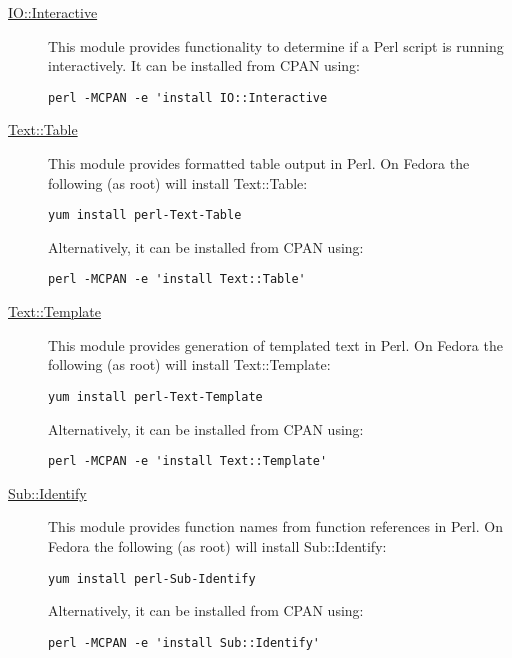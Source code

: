\begin{description}
  \item [\href{http://search.cpan.org/~bdfoy/IO-Interactive-0.0.6/lib/IO/Interactive.pm}{{\normalfont \ttfamily IO::Interactive}}] This module provides functionality to determine if a Perl script is running interactively. It can be installed from CPAN using:
\begin{verbatim}
perl -MCPAN -e 'install IO::Interactive
\end{verbatim}

  \item [\href{http://search.cpan.org/~anno/Text-Table-1.114/lib/Text/Table.pm}{{\normalfont \ttfamily Text::Table}}] This module provides formatted table output in Perl. On Fedora the following (as root) will install {\normalfont \ttfamily Text::Table}:
\begin{verbatim}
yum install perl-Text-Table
\end{verbatim}
Alternatively, it can be installed from CPAN using:
\begin{verbatim}
perl -MCPAN -e 'install Text::Table'
\end{verbatim}

  \item [\href{http://search.cpan.org/~mjd/Text-Template-1.46/lib/Text/Template.pm}{{\normalfont \ttfamily Text::Template}}] This module provides generation of templated text in Perl. On Fedora the following (as root) will install {\normalfont \ttfamily Text::Template}:
\begin{verbatim}
yum install perl-Text-Template
\end{verbatim}
Alternatively, it can be installed from CPAN using:
\begin{verbatim}
perl -MCPAN -e 'install Text::Template'
\end{verbatim}

  \item [\href{http://search.cpan.org/~rgarcia/Sub-Identify-0.12/lib/Sub/Identify.pm}{{\normalfont \ttfamily Sub::Identify}}] This module provides function names from function references in Perl. On Fedora the following (as root) will install {\normalfont \ttfamily Sub::Identify}:
\begin{verbatim}
yum install perl-Sub-Identify
\end{verbatim}
Alternatively, it can be installed from CPAN using:
\begin{verbatim}
perl -MCPAN -e 'install Sub::Identify'
\end{verbatim}


\end{description}

